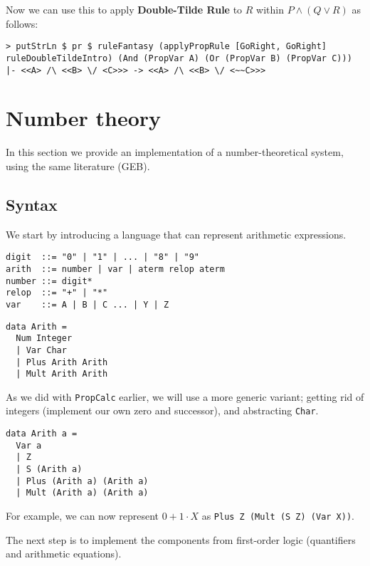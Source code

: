 \documentclass{article}
\begin{document}
Now we can use this to apply \textbf{Double-Tilde Rule} to $R$ within $P \land (Q \lor R)$ as follows:

\begin{lstlisting}
> putStrLn $ pr $ ruleFantasy (applyPropRule [GoRight, GoRight] ruleDoubleTildeIntro) (And (PropVar A) (Or (PropVar B) (PropVar C)))
|- <<A> /\ <<B> \/ <C>>> -> <<A> /\ <<B> \/ <~~C>>>
\end{lstlisting}

\section{Number theory}

In this section we provide an implementation of a number-theoretical system, using the same literature (GEB).

\subsection{Syntax}

We start by introducing a language that can represent arithmetic expressions.

\begin{minipage}{0.49\textwidth}
\begin{lstlisting}
digit  ::= "0" | "1" | ... | "8" | "9"
arith  ::= number | var | aterm relop aterm
number ::= digit*
relop  ::= "+" | "*"
var    ::= A | B | C ... | Y | Z
\end{lstlisting}
\end{minipage}
\begin{minipage}{0.49\textwidth}
\begin{lstlisting}
data Arith =
  Num Integer
  | Var Char
  | Plus Arith Arith
  | Mult Arith Arith
\end{lstlisting}
\end{minipage}

As we did with \texttt{PropCalc} earlier, we will use a more generic variant; getting rid of integers (implement our own zero and successor), and abstracting \texttt{Char}.

\begin{lstlisting}
data Arith a =
  Var a
  | Z
  | S (Arith a)
  | Plus (Arith a) (Arith a)
  | Mult (Arith a) (Arith a)
\end{lstlisting}

For example, we can now represent $0 + 1 \cdot X$ as \texttt{Plus Z (Mult (S Z) (Var X))}.

The next step is to implement the components from first-order logic (quantifiers and arithmetic equations).
\end{document}
